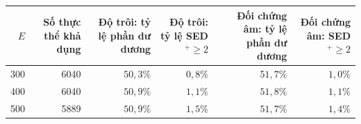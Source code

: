 \begin{tabular}{rrrrrr}
\toprule
$E$ & Số thực thể khả dụng & Độ trôi: tỷ lệ phần dư dương & Độ trôi: tỷ lệ SED$^+\geq 2$ & Đối chứng âm: tỷ lệ phần dư dương & Đối chứng âm: SED$^+\geq 2$ \\
\midrule
300 & 6040 & $50{,}3\%$ & $0{,}8\%$ & $51{,}7\%$ & $1{,}0\%$ \\
400 & 6040 & $50{,}9\%$ & $1{,}1\%$ & $51{,}8\%$ & $1{,}1\%$ \\
500 & 5889 & $50{,}9\%$ & $1{,}5\%$ & $51{,}7\%$ & $1{,}4\%$ \\
\bottomrule
\end{tabular}
